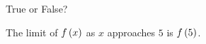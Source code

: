 \documentclass{ximera}
\author{Gregory Hartman \and Matthew Carr}
\begin{document}
\begin{exercise}



True or False? 
\begin{center}
The limit of $f\left(x\right)$ as $x$ approaches $5$ is $f\left(5\right)$.
\end{center}
\begin{prompt}
\begin{multipleChoice}
\end{multipleChoice}
\end{prompt}

\end{exercise}
\end{document}
